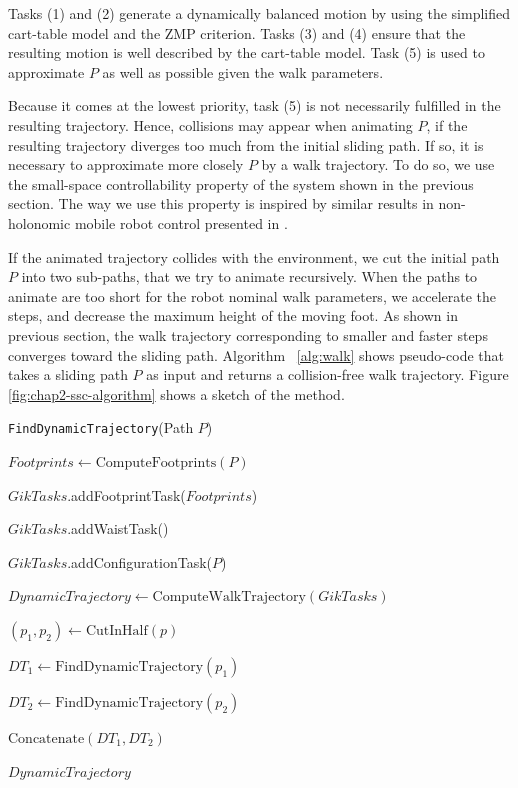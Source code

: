 Tasks (1) and (2) generate a dynamically balanced motion by using the
simplified cart-table model and the ZMP criterion. Tasks (3) and (4)
ensure that the resulting motion is well described by the cart-table
model. Task (5) is used to approximate $P$ as well as possible given
the walk parameters.

Because it comes at the  lowest priority, task (5) is not necessarily
fulfilled in  the resulting trajectory. Hence,  collisions may appear
when animating $P$, if the resulting trajectory diverges too much from
the initial sliding  path. If so, it is  necessary to approximate more
closely $P$  by a walk  trajectory.  To do  so, we use  the small-space
controllability  property   of  the  system  shown   in  the  previous
section. The way  we use this property is  inspired by similar results
in non-holonomic mobile robot control presented in \cite{taix-94}.

If the animated trajectory collides with the environment, we cut the
initial path $P$ into two sub-paths, that we try to animate
recursively. When the paths to animate are too short for the robot
nominal walk parameters, we accelerate the steps, and decrease the
maximum height of the moving foot. As shown in previous section, the
walk trajectory corresponding to smaller and faster steps converges
toward the sliding path.  Algorithm ~\ref{alg:walk} shows pseudo-code
that takes a sliding path $P$ as input and returns a collision-free
walk trajectory. Figure \ref{fig:chap2-ssc-algorithm} shows a sketch
of the method.

\begin{algorithm}
\caption{\texttt{FindDynamicTrajectory}(Path $P$)}
\label{alg:walk}
\begin{algorithmic}
\STATE $Footprints \leftarrow \text{ComputeFootprints}(P)$

\STATE $GikTasks$.addFootprintTask($Footprints$)

\STATE $GikTasks$.addWaistTask()

\STATE $GikTasks$.addConfigurationTask($P$)

\STATE $DynamicTrajectory \leftarrow
\text{ComputeWalkTrajectory}(GikTasks)$


\STATE $(p_1,p_2) \leftarrow \text{CutInHalf}(p)$

\STATE $DT_1 \leftarrow \text{FindDynamicTrajectory}(p_1)$

\STATE $DT_2 \leftarrow \text{FindDynamicTrajectory}(p_2)$

\RETURN $\text{Concatenate}(DT_1,DT_2)$

\ELSE

\RETURN $DynamicTrajectory$

\ENDIF
\end{algorithmic}
\end{algorithm}

